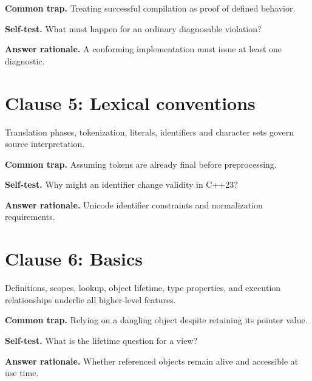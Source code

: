 \documentclass[11pt]{article}
\begin{document}
\textbf{Common trap.} Treating successful compilation as proof of defined behavior.

\textbf{Self-test.} What must happen for an ordinary diagnosable violation?

\textbf{Answer rationale.} A conforming implementation must issue at least one diagnostic.

\section{Clause 5: Lexical conventions}
Translation phases, tokenization, literals, identifiers and character sets govern source interpretation.

\textbf{Common trap.} Assuming tokens are already final before preprocessing.

\textbf{Self-test.} Why might an identifier change validity in C++23?

\textbf{Answer rationale.} Unicode identifier constraints and normalization requirements.

\section{Clause 6: Basics}
Definitions, scopes, lookup, object lifetime, type properties, and execution relationships underlie all higher-level features.

\textbf{Common trap.} Relying on a dangling object despite retaining its pointer value.

\textbf{Self-test.} What is the lifetime question for a view?

\textbf{Answer rationale.} Whether referenced objects remain alive and accessible at use time.
\end{document}

